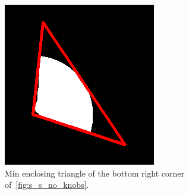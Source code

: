 \documentclass{article}
\begin{document}
\begin{figure}\ContinuedFloat
  \begin{subfigure}{0.3\textwidth}
    \centering
    \includegraphics[width=\linewidth]{pictures/find_corners_min_enclosing_triangle.png}
    \caption{Min enclosing triangle of the bottom right corner of~\cref{fig:s_s_no_knobs}.}
    \label{fig:s_s_min_enc_triangle}
  \end{subfigure}
  \hfill
  \begin{subfigure}{0.3\textwidth}
    \centering

\end{subfigure}
\end{figure}
\end{document}
